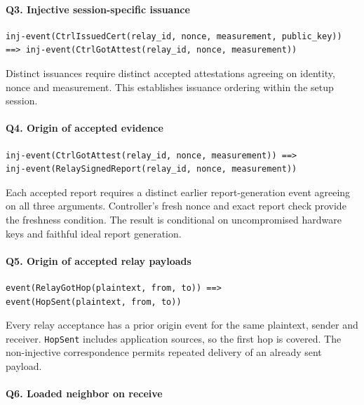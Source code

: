 \documentclass[futureinternet,article,submit,moreauthors]{Definitions/mdpi}
\begin{document}
\paragraph{Q3. Injective session-specific issuance}

\begin{lstlisting}
inj-event(CtrlIssuedCert(relay_id, nonce, measurement, public_key)) ==> inj-event(CtrlGotAttest(relay_id, nonce, measurement))
\end{lstlisting}

Distinct issuances require distinct accepted attestations agreeing on identity, nonce and measurement. This establishes issuance ordering within the setup session.

\paragraph{Q4. Origin of accepted evidence}

\begin{lstlisting}
inj-event(CtrlGotAttest(relay_id, nonce, measurement)) ==>
inj-event(RelaySignedReport(relay_id, nonce, measurement))
\end{lstlisting}

Each accepted report requires a distinct earlier report-generation event agreeing on all three arguments. Controller's fresh nonce and exact report check provide the freshness condition. The result is conditional on uncompromised hardware keys and faithful ideal report generation.

\paragraph{Q5. Origin of accepted relay payloads}

\begin{lstlisting}
event(RelayGotHop(plaintext, from, to)) ==>
event(HopSent(plaintext, from, to))
\end{lstlisting}

Every relay acceptance has a prior origin event for the same plaintext, sender and receiver. \texttt{HopSent} includes application sources, so the first hop is covered. The non-injective correspondence permits repeated delivery of an already sent payload.

\paragraph{Q6. Loaded neighbor on receive}
\end{document}
